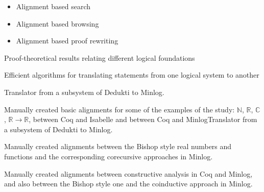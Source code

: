\begin{workpackage}
\begin{tasklist}
  \begin{task}[id=alignservices,title=Alignment based services,lead=Fau]
    \begin{itemize}
    \item Alignment based search
    \item Alignment based browsing
    \item Alignment based proof rewriting
    \end{itemize}
  \end{task}
\end{tasklist}

\begin{wpdelivs}
  \begin{wpdeliv}[due=3,miles=startup,id=prooftheoretical,dissem=PU,nature=DEM,lead=Lee]
    {Proof-theoretical results relating different logical foundations}
  \end{wpdeliv}
  \begin{wpdeliv}[due=3,miles=startup,id=translatingstatements,dissem=PU,nature=DEM,lead=Lee]
    {Efficient algorithms for translating statements from one logical system to another}
  \end{wpdeliv}
  \begin{wpdeliv}[due=3,miles=startup,id=deduktitominilog,dissem=PU,nature=DEM,lead=Lmu]
    {Translator from a subsystem of Dedukti to Minlog. }
  \end{wpdeliv}
  \begin{wpdeliv}[due=3,miles=startup,id=aligningnumbers,dissem=PU,nature=DEM,lead=Str]
    {Manually created basic alignments for some of the examples of the
      study: $\mathbb{N}$, $\mathbb{R}$, $\mathbb{C}$, $\mathbb{R}
      \rightarrow \mathbb{R}$, between Coq and Isabelle and between
      Coq and MinlogTranslator from a subsystem of Dedukti to
      Minlog.}
  \end{wpdeliv}
  \begin{wpdeliv}[due=3,miles=startup,id=aligningnumbersminilog,dissem=PU,nature=DEM,lead=Lmu]
    {Manually created alignments between the Bishop style real numbers
      and functions and the corresponding corecursive approaches in
      Minlog.}
  \end{wpdeliv}
  \begin{wpdeliv}[due=3,miles=startup,id=aligningconstructiveanalysisminilog,dissem=PU,nature=DEM,lead=Lmu]
    {Manually created alignments between constructive analysis in Coq
      and Minlog, and also between the Bishop style one and the
      coinductive approach in Minlog.}
  \end{wpdeliv}

\end{wpdelivs}
\end{workpackage}

